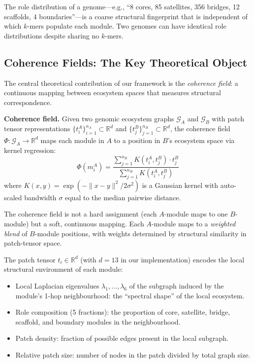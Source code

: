 \documentclass{../yalumba}
\begin{document}
The role distribution of a genome---e.g., ``8 cores, 85 satellites, 356
bridges, 12 scaffolds, 4 boundaries''---is a coarse structural
fingerprint that is independent of which $k$-mers populate each module.
Two genomes can have identical role distributions despite sharing no
$k$-mers.

\subsection{Coherence Fields: The Key Theoretical Object}
\label{sec:framework:fields}

The central theoretical contribution of our framework is the
\emph{coherence field}: a continuous mapping between ecosystem spaces
that measures structural correspondence.

\begin{definition}
\textbf{Coherence field.}  Given two genomic ecosystem graphs
$\mathcal{G}_A$ and $\mathcal{G}_B$ with patch tensor representations
$\{t_i^A\}_{i=1}^{n_A} \subset \mathbb{R}^d$ and $\{t_j^B\}_{j=1}^{n_B}
\subset \mathbb{R}^d$, the coherence field $\Phi: \mathcal{G}_A \to
\mathbb{R}^d$ maps each module in $A$ to a position in $B$'s ecosystem
space via kernel regression:
\begin{equation}
  \Phi(m_i^A) = \frac{\sum_{j=1}^{n_B} K(t_i^A, t_j^B) \cdot t_j^B}
                      {\sum_{j=1}^{n_B} K(t_i^A, t_j^B)}
  \label{eq:coherence_field}
\end{equation}
where $K(x, y) = \exp\!\left(-\|x - y\|^2 / 2\sigma^2\right)$ is a
Gaussian kernel with auto-scaled bandwidth $\sigma$ equal to the median
pairwise distance.
\end{definition}

The coherence field is not a hard assignment (each $A$-module maps to
one $B$-module) but a soft, continuous mapping.  Each $A$-module maps to
a \emph{weighted blend} of $B$-module positions, with weights
determined by structural similarity in patch-tensor space.


The patch tensor $t_i \in \mathbb{R}^d$ (with $d = 13$ in our
implementation) encodes the local structural environment of each module:

\begin{itemize}
  \item Local Laplacian eigenvalues $\lambda_1, \ldots, \lambda_6$ of
    the subgraph induced by the module's 1-hop neighbourhood: the
    ``spectral shape'' of the local ecosystem.
  \item Role composition (5 fractions): the proportion of core,
    satellite, bridge, scaffold, and boundary modules in the
    neighbourhood.
  \item Patch density: fraction of possible edges present in the local
    subgraph.
  \item Relative patch size: number of nodes in the patch divided by
    total graph size.
\end{itemize}
\end{document}
